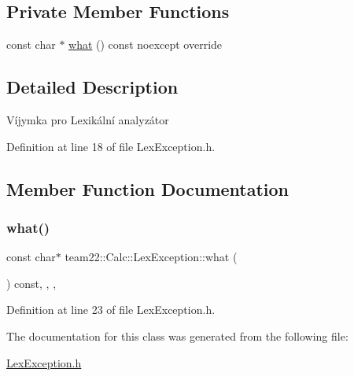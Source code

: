 \subsection*{Private Member Functions}
\begin{DoxyCompactItemize}
\item 
const char $\ast$ \hyperlink{classteam22_1_1_calc_1_1_lex_exception_afeba1f355eee4aacad8cb7409b1ee3ea}{what} () const noexcept override
\end{DoxyCompactItemize}


\subsection{Detailed Description}
Víjymka pro Lexikální analyzátor 

Definition at line 18 of file Lex\+Exception.\+h.



\subsection{Member Function Documentation}
\mbox{\label{classteam22_1_1_calc_1_1_lex_exception_afeba1f355eee4aacad8cb7409b1ee3ea}} 
\subsubsection{\texorpdfstring{what()}{what()}}
{\footnotesize\ttfamily const char$\ast$ team22\+::\+Calc\+::\+Lex\+Exception\+::what (\begin{DoxyParamCaption}{ }\end{DoxyParamCaption}) const\hspace{0.3cm}{\ttfamily [inline]}, {\ttfamily [override]}, {\ttfamily [private]}, {\ttfamily [noexcept]}}



Definition at line 23 of file Lex\+Exception.\+h.



The documentation for this class was generated from the following file\+:\begin{DoxyCompactItemize}
\item 
\hyperlink{_lex_exception_8h}{Lex\+Exception.\+h}\end{DoxyCompactItemize}
